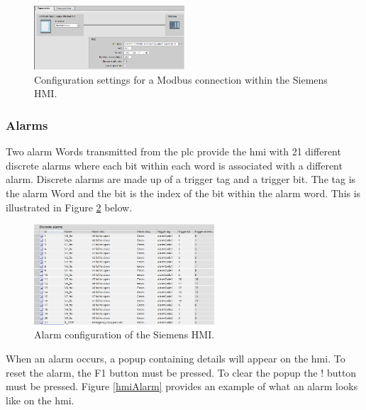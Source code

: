         \begin{figure}[H]
            \centering
            \includegraphics[width = 0.5\textwidth]{2_images/modbusHmiConfig}
            \caption{Configuration settings for a Modbus connection within the Siemens HMI.}
            \label{fig:modbusHmiConfig}
        \end{figure}        
        
        \subsubsection{Alarms}
            Two alarm Words transmitted from the \acrshort{plc} provide the \acrshort{hmi} with 21 different discrete alarms where each bit within each word is associated with a different alarm. Discrete alarms are made up of a trigger tag and a trigger bit. The tag is the alarm Word and the bit is the index of the bit within the alarm word. This is illustrated in Figure \ref{fig:hmiAlarms} below.

        \begin{figure}[H]
            \centering
            \includegraphics[width = 0.6\textwidth]{2_images/hmiAlarms}
            \caption{Alarm configuration of the Siemens HMI.}
            \label{fig:hmiAlarms}
        \end{figure}    

         When an alarm occurs, a popup containing details will appear on the \acrshort{hmi}. To reset the alarm, the F1 button must be pressed. To clear the popup the ! button must be pressed. Figure \ref{hmiAlarm} provides an example of what an alarm looks like on the \acrshort{hmi}.

